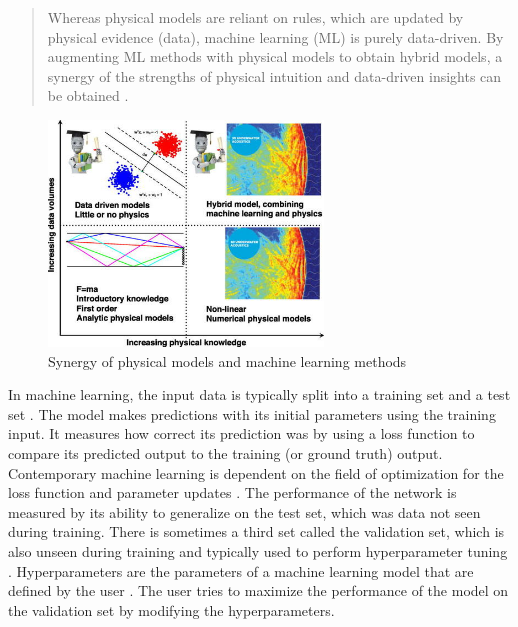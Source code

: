 \documentclass[report.tex]{subfiles}
\begin{document}
\begin{quote}
	Whereas physical models are reliant on rules, which are updated by physical evidence (data), machine learning (ML) is purely data-driven. By augmenting ML methods with physical models to obtain hybrid models, a synergy of the strengths of physical intuition and data-driven insights can be obtained \parencite[3591]{mldspmix}.
\end{quote}

\begin{figure}[ht]
	\centering
	\includegraphics[width=0.65\textwidth]{./images-neural/dspmlmix.jpg}
	\caption{Synergy of physical models and machine learning methods \parencite[3591]{mldspmix}}
	\label{fig:dspmlmix}
\end{figure}

In machine learning, the input data is typically split into a training set and a test set \parencite{introtoml}. The model makes predictions with its initial parameters using the training input. It measures how correct its prediction was by using a loss function to compare its predicted output to the training (or ground truth) output. Contemporary machine learning is dependent on the field of optimization \parencite{boyd2004convex, mlopt1, mlopt2} for the loss function and parameter updates \parencite{sgd}. The performance of the network is measured by its ability to generalize on the test set, which was data not seen during training. There is sometimes a third set called the validation set, which is also unseen during training and typically used to perform hyperparameter tuning \parencite{splitvaliddata}. Hyperparameters are the parameters of a machine learning model that are defined by the user \parencite{introtodl}. The user tries to maximize the performance of the model on the validation set by modifying the hyperparameters.
\end{document}
